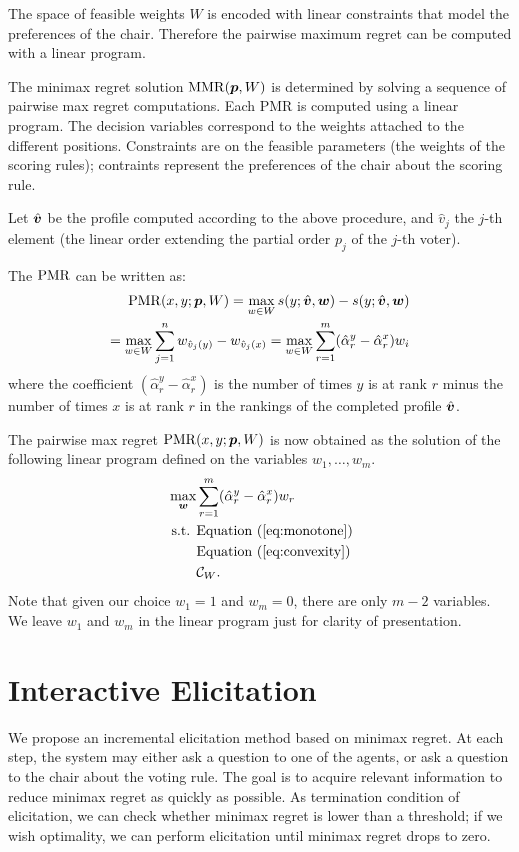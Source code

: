 The space of feasible weights $W$ is encoded with linear constraints that model the preferences of the chair.
Therefore the pairwise maximum regret can be computed with a linear program.

The minimax regret solution $\operatorname{MMR}({\bm{p}}, W)$ is determined by solving a sequence of pairwise max regret computations.
Each PMR is computed using a linear program.
The decision variables correspond to the weights attached to the different positions.
Constraints are on the feasible parameters (the weights of the scoring rules); contraints represent the preferences of the chair about the scoring rule.

Let $\hat{\bm{v}}$ be the profile computed according to the above procedure, and  $\hat{v}_j$ the $j$-th element (the linear order extending the partial order $p_j$ of the $j$-th voter).
\begin{claim}
The $\operatorname{PMR}$ can be written as:
\begin{align} 
\operatorname{PMR}(x,y; {\bm{p}}, W) =  
\max_{w \in W} s(y; \hat{\bm{v}}, \bm{w}) - s(y; \hat{\bm{v}}, \bm{w})\\
=\max_{w \in W} \sum_{j=1}^n w_{\hat{v}_j(y)} - w_{\hat{v}_j(x)} =
\max_{w \in W} \sum_{r=1}^m (\hat{\alpha}_{r}^{y} - \hat{\alpha}_{r}^{x}) w_i 
\end{align}
where the coefficient $ (\hat{\alpha}_{r}^{y} - \hat{\alpha}_{r}^{x})$ is the number of times $y$ is at rank $r$ minus the number of times $x$ is at rank $r$ in the rankings of the completed profile $\hat{\bm{v}}$.
\end{claim}
The pairwise max regret $\operatorname{PMR}(x,y; {\bm{p}},W)$ is now obtained as the solution of the following linear program defined on the variables $w_1, …, w_m$. 
\begin{align*}
\max_{\bm{w}} & \sum_{r=1}^m (\hat{\alpha}_{r}^{y} - \hat{\alpha}_{r}^{x}) w_{r}\\
\text{ s.t. } & \text{Equation } (\ref{eq:monotone})\\
& \text{Equation } (\ref{eq:convexity})\\
& \mathcal{C}_W.
\end{align*}
Note that given our choice $w_{1}=1$ and $w_{m}=0$, there are only $m-2$ variables. We leave $w_{1}$ and $w_{m}$ in the linear program just for clarity of presentation.

\section{Interactive Elicitation} 
\label{sec:elicit}
We propose an incremental elicitation method based on minimax regret.
At each step, the system may either ask a question to one of the agents, or ask a question to the chair about the voting rule. 
The goal is to acquire relevant information to reduce minimax regret as quickly as possible.
As termination condition of elicitation, we can check whether minimax regret is lower than a threshold; if we wish optimality, we can perform elicitation until minimax regret drops to zero.

